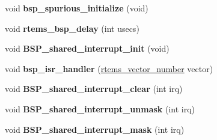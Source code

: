 \begin{DoxyCompactItemize}
\mbox{\label{group__RTEMSBSPsSPARCLEON3_gab8c95f338c439b2257bb0f4dc3bc53ae}} 
void {\bfseries bsp\+\_\+spurious\+\_\+initialize} (void)
\item 
\mbox{\label{group__RTEMSBSPsSPARCLEON3_ga965c5aba9fff0445772a5ec19348cd3c}} 
void {\bfseries rtems\+\_\+bsp\+\_\+delay} (int usecs)
\item 
\mbox{\label{group__RTEMSBSPsSPARCLEON3_ga6069e1c3859da4080ac440883211b2b5}} 
void {\bfseries B\+S\+P\+\_\+shared\+\_\+interrupt\+\_\+init} (void)
\item 
\mbox{\label{group__RTEMSBSPsSPARCLEON3_ga6b05ff5e3f13132107c892ff7bfd583d}} 
void {\bfseries bsp\+\_\+isr\+\_\+handler} (\mbox{\hyperlink{group__ClassicINTR_ga3e434c197d99f128e78cae4d9358bd8b}{rtems\+\_\+vector\+\_\+number}} vector)
\item 
\mbox{\label{group__RTEMSBSPsSPARCLEON3_ga700fa96fc6d0ce5340d7b2facc36c15e}} 
void {\bfseries B\+S\+P\+\_\+shared\+\_\+interrupt\+\_\+clear} (int irq)
\item 
\mbox{\label{group__RTEMSBSPsSPARCLEON3_gad8080ffcdab31a4177a4e9b8f55db25b}} 
void {\bfseries B\+S\+P\+\_\+shared\+\_\+interrupt\+\_\+unmask} (int irq)
\item 
\mbox{\label{group__RTEMSBSPsSPARCLEON3_ga5f113e9992f3497076272b5fb473f336}} 
void {\bfseries B\+S\+P\+\_\+shared\+\_\+interrupt\+\_\+mask} (int irq)
\end{DoxyCompactItemize}
